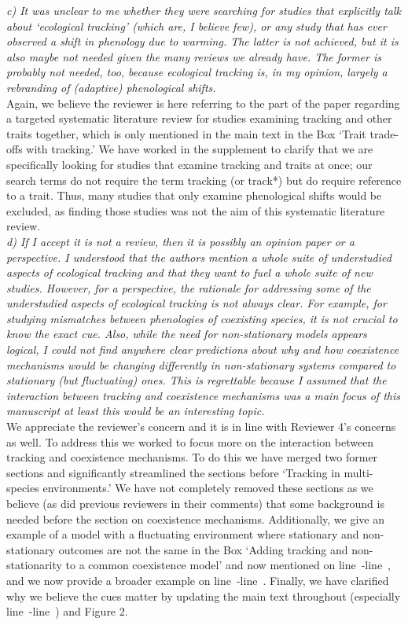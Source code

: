 \documentclass[11pt,letterpaper]{article}
\newcommand{\lr}[1]{line~\lineref{#1}}
\begin{document}
\emph{c) It was unclear to me whether they were searching for studies that explicitly talk about
`ecological tracking' (which are, I believe few), or any study that has ever observed a shift
in phenology due to warming. The latter is not achieved, but it is also maybe not needed
given the many reviews we already have. The former is probably not needed, too, because
ecological tracking is, in my opinion, largely a rebranding of (adaptive) phenological
shifts.}\\

Again, we believe the reviewer is here referring to the part of the paper regarding a targeted systematic literature review for studies examining tracking and other traits together, which is only mentioned in the main text in the Box `Trait trade-offs with tracking.' We have worked in the supplement to clarify that we are specifically looking for studies that examine tracking and traits at once; our search terms do not require the term tracking (or track*) but do require reference to a trait. Thus, many studies that only examine phenological shifts would be excluded, as finding those studies was not the aim of this systematic literature review. \\ 

\emph{d) If I accept it is not a review, then it is possibly an opinion paper or a perspective. I
understood that the authors mention a whole suite of understudied aspects of ecological
tracking and that they want to fuel a whole suite of new studies. However, for a perspective,
the rationale for addressing some of the understudied aspects of ecological tracking is not
always clear. For example, for studying mismatches between phenologies of coexisting species,
it is not crucial to know the exact cue. Also, while the need for non-stationary models
appears logical, I could not find anywhere clear predictions about why and how coexistence
mechanisms would be changing differently in non-stationary systems compared to stationary
(but fluctuating) ones. This is regrettable because I assumed that the interaction between
tracking and coexistence mechanisms was a main focus of this manuscript at least this would
be an interesting topic.}\\

We appreciate the reviewer's concern and it is in line with Reviewer 4's concerns as well. To address this we worked to focus more on the interaction between tracking and coexistence mechanisms. To do this we have merged two former sections and significantly streamlined the sections before `Tracking in multi-species environments.' We have not completely removed these sections as we believe (as did previous reviewers in their comments) that some background is needed before the section on coexistence mechanisms. Additionally, we give an example of a model with a fluctuating environment where stationary and non-stationary outcomes are not the same in the Box `Adding tracking and non-stationarity to a common coexistence model' and now mentioned on \lr{r1dS1}-\lr{r1dE1}, and we now provide a broader example on \lr{r1dS}-\lr{r1dE}. Finally, we have clarified why we believe the cues matter by updating the main text throughout (especially \lr{r3birdsS}-\lr{r3birdsE}) and Figure 2. \\
\end{document}
